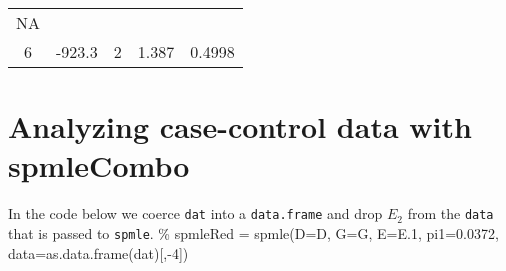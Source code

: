 \documentclass[11pt,]{article}
\begin{document}
\begin{longtable}[]{@{}ccccc@{}}
\begin{minipage}[t]{0.14\columnwidth}
NA\strut
\end{minipage}\tabularnewline
\begin{minipage}[t]{0.07\columnwidth}\centering\strut
6\strut
\end{minipage} & \begin{minipage}[t]{0.11\columnwidth}\centering\strut
-923.3\strut
\end{minipage} & \begin{minipage}[t]{0.06\columnwidth}\centering\strut
2\strut
\end{minipage} & \begin{minipage}[t]{0.10\columnwidth}\centering\strut
1.387\strut
\end{minipage} & \begin{minipage}[t]{0.14\columnwidth}\centering\strut
0.4998\strut
\end{minipage}\tabularnewline
\bottomrule
\end{longtable}

\section{Analyzing case-control data with spmleCombo} \label{sec:spmleCombo}

In the code below we coerce \texttt{dat} into a \texttt{data.frame} and
drop \(E_2\) from the \texttt{data} that is passed to \texttt{spmle}. \%
spmleRed = spmle(D=D, G=G, E=E.1, pi1=0.0372,
data=as.data.frame(dat){[},-4{]})


\end{document}

